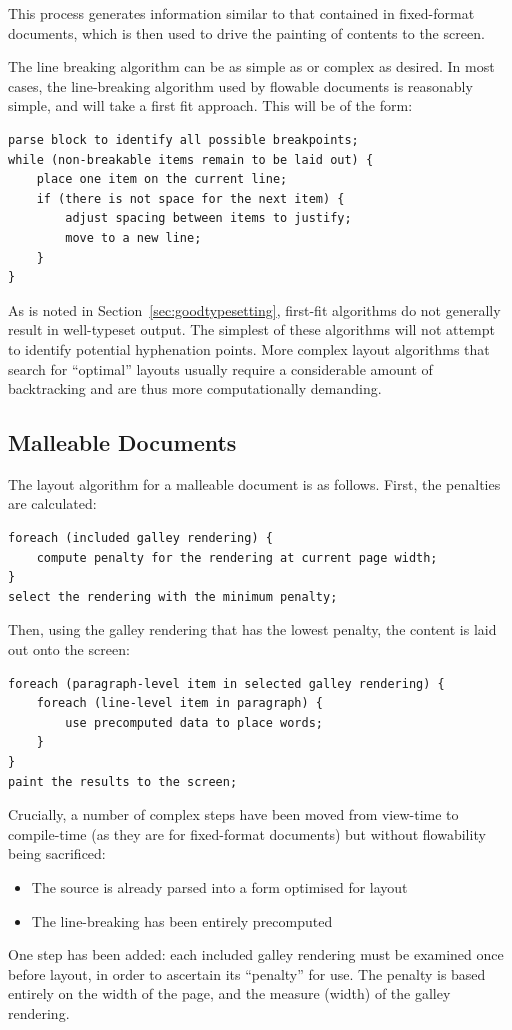 This process generates information similar to that contained in fixed-format documents, which is then used to drive the painting of contents to the screen.

The line breaking algorithm can be as simple as or complex as desired. In most cases, the line-breaking algorithm used by flowable documents is reasonably simple, and will take a first fit approach. This will be of the form:

{\singlespacing
\begin{lstlisting}
parse block to identify all possible breakpoints;
while (non-breakable items remain to be laid out) {
    place one item on the current line;
    if (there is not space for the next item) {
        adjust spacing between items to justify;
        move to a new line;
    }
}
\end{lstlisting}
}

As is noted in Section~\ref{sec:goodtypesetting}, first-fit algorithms do not generally result in well-typeset output. The simplest of these algorithms will not attempt to identify potential hyphenation points. More complex layout algorithms that search for ``optimal'' layouts usually require a considerable amount of backtracking and are thus more computationally demanding.

\newpage
\subsection{Malleable Documents}

The layout algorithm for a malleable document is as follows. First, the penalties are calculated:

{\singlespacing
\begin{lstlisting}
foreach (included galley rendering) {
    compute penalty for the rendering at current page width;
}
select the rendering with the minimum penalty;
\end{lstlisting}
}


Then, using the galley rendering that has the lowest penalty, the content is laid out onto the screen:

{\singlespacing
\begin{lstlisting}
foreach (paragraph-level item in selected galley rendering) {
    foreach (line-level item in paragraph) {
        use precomputed data to place words;
    }
}
paint the results to the screen;
\end{lstlisting}
}
Crucially, a number of complex steps have been moved from view-time to compile-time (as they are for fixed-format documents) but without flowability being sacrificed:
\begin{itemize}
 \item The source is already parsed into a form optimised for layout
 \item The line-breaking has been entirely precomputed
\end{itemize}
One step has been added: each included galley rendering must be examined once before layout, in order to ascertain its ``penalty'' for use. The penalty is based entirely on the width of the page, and the \gls{measure} (width) of the galley rendering.%

